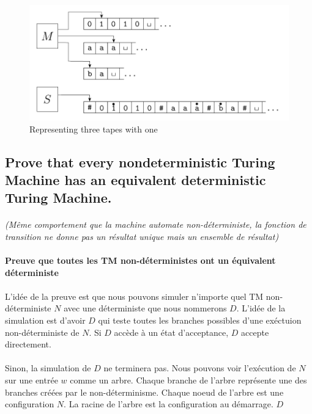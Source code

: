 \begin{figure}[H]
\centering
\includegraphics[width=\textwidth]{img_3_3__0}
\caption{Representing three tapes with one}
\end{figure}

\subsection{Prove that every nondeterministic Turing Machine has an equivalent deterministic Turing Machine.}

\paragraph{}
\textit{(Même comportement que la machine automate non-déterministe, la fonction de transition ne donne pas un résultat unique mais un ensemble de résultat)}

\paragraph{Preuve que toutes les TM non-déterministes ont un équivalent déterministe}

\paragraph{}
L'idée de la preuve est que nous pouvons simuler n'importe quel TM non-déterministe $N$ avec une déterministe que nous nommerons $D$. L'idée de la simulation est d'avoir $D$ qui teste toutes les branches possibles d'une exéctuion non-déterministe de $N$. Si $D$ accède à un état d'acceptance, $D$ accepte directement. 

\paragraph{}
Sinon, la simulation de $D$ ne terminera pas. Nous pouvons voir l'exécution de $N$ sur une entrée $w$ comme un arbre. Chaque branche de l'arbre représente une des branches créées par le non-déterminisme. Chaque noeud de l'arbre est une configuration $N$. La racine de l'arbre est la configuration au démarrage. $D$ 

